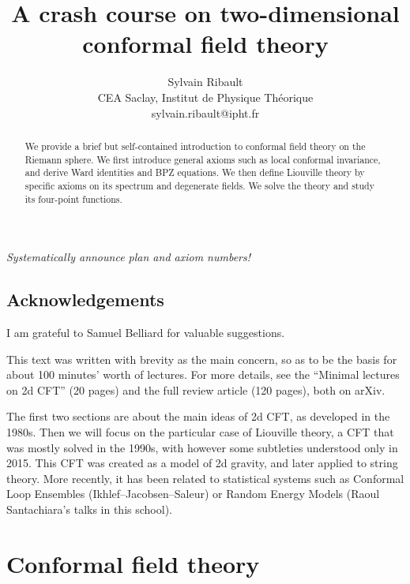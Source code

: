 \documentclass[12pt, a4paper]{article}
\title{\bfseries A crash course on two-dimensional \\ conformal field theory}
\author{Sylvain Ribault \vspace{2mm}
\\
{\normalsize CEA Saclay, Institut de Physique Th\'eorique}
 \\
 {\footnotesize \ttfamily sylvain.ribault@ipht.fr }
}
\theoremstyle{break}
\begin{document}
\maketitle


\begin{abstract}
We provide a brief but self-contained introduction to conformal field theory on the Riemann sphere. We first introduce general axioms such as local conformal invariance, and derive Ward identities and BPZ equations. We then define Liouville theory by specific axioms on its spectrum and degenerate fields. We solve the theory and study its four-point functions.
\end{abstract}

\tableofcontents

\vspace{10mm}

\textit{Systematically announce plan and axiom numbers!}


\subsection*{Acknowledgements}

I am grateful to Samuel Belliard for valuable suggestions.

\clearpage

\hypersetup{linkcolor=blue}



This text was written with brevity as the main concern, so as to be the basis for about 100 minutes' worth of lectures. For more details, see the ``Minimal lectures on 2d CFT'' \cite{rib16} (20 pages) and the full review article \cite{rib14} (120 pages), both on arXiv.

The first two sections are about the main ideas of 2d CFT, as developed in the 1980s. Then we will focus on the particular case of Liouville theory, a CFT that was mostly solved in the 1990s, with however some subtleties understood only in 2015. This CFT was created as a model of 2d gravity, and later applied to string theory. More recently, it has been related to statistical systems such as Conformal Loop Ensembles (Ikhlef--Jacobsen--Saleur) or Random Energy Models (Raoul Santachiara's talks in this school).

\section{Conformal field theory}
\end{document}
